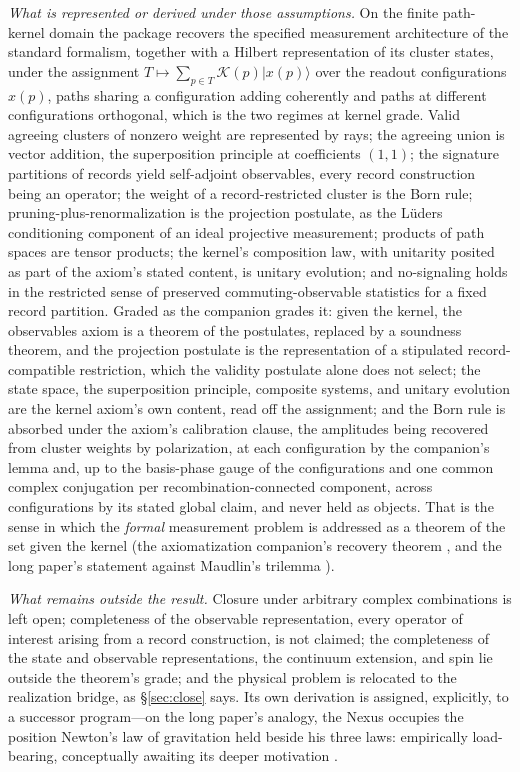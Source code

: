 \documentclass[11pt]{article}
\theoremstyle{definition}
\begin{document}
\textit{What is represented or derived under those assumptions.} On the finite path-kernel domain the package recovers the specified measurement architecture of the standard formalism, together with a Hilbert representation of its cluster states, under the assignment $T \mapsto \sum_{p \in T} \mathcal{K}(p)|x(p)\rangle$ over the readout configurations $x(p)$, paths sharing a configuration adding coherently and paths at different configurations orthogonal, which is the two regimes at kernel grade. Valid agreeing clusters of nonzero weight are represented by rays; the agreeing union is vector addition, the superposition principle at coefficients $(1,1)$; the signature partitions of records yield self-adjoint observables, every record construction being an operator; the weight of a record-restricted cluster is the Born rule; pruning-plus-renormalization is the projection postulate, as the L\"uders conditioning component of an ideal projective measurement; products of path spaces are tensor products; the kernel's composition law, with unitarity posited as part of the axiom's stated content, is unitary evolution; and no-signaling holds in the restricted sense of preserved commuting-observable statistics for a fixed record partition. Graded as the companion grades it: given the kernel, the observables axiom is a theorem of the postulates, replaced by a soundness theorem, and the projection postulate is the representation of a stipulated record-compatible restriction, which the validity postulate alone does not select; the state space, the superposition principle, composite systems, and unitary evolution are the kernel axiom's own content, read off the assignment; and the Born rule is absorbed under the axiom's calibration clause, the amplitudes being recovered from cluster weights by polarization, at each configuration by the companion's lemma and, up to the basis-phase gauge of the configurations and one common complex conjugation per recombination-connected component, across configurations by its stated global claim, and never held as objects. That is the sense in which the \emph{formal} measurement problem is addressed as a theorem of the set given the kernel (the axiomatization companion's recovery theorem \cite{AethusQuant}, and the long paper's statement against Maudlin's trilemma \cite{Aethus}).

\textit{What remains outside the result.} Closure under arbitrary complex combinations is left open; completeness of the observable representation, every operator of interest arising from a record construction, is not claimed; the completeness of the state and observable representations, the continuum extension, and spin lie outside the theorem's grade; and the physical problem is relocated to the realization bridge, as \S\ref{sec:close} says. Its own derivation is assigned, explicitly, to a successor program---on the long paper's analogy, the Nexus occupies the position Newton's law of gravitation held beside his three laws: empirically load-bearing, conceptually awaiting its deeper motivation \cite{Aethus}.
\end{document}

